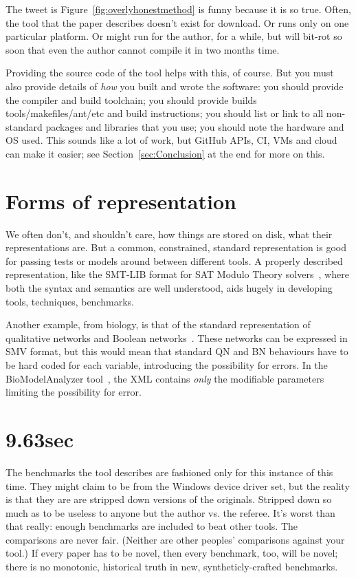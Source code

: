 \documentclass[conference]{IEEEtran}
\begin{document}
The tweet is Figure~\ref{fig:overlyhonestmethod} is funny because it
is so true. Often, the tool that the paper describes doesn't exist for
download. Or runs only on one particular platform. Or might run for
the author, for a while, but will bit-rot so soon that even the author
cannot compile it in two months time.

Providing the source code of the tool helps with this, of course. But
you must also provide details of \emph{how} you built and wrote the
software:
%
you should provide the compiler and build toolchain; 
%
you should provide builds tools/makefiles/ant/etc and build instructions; 
%
you should list or link to all non-standard packages and libraries that you use; 
%
you should note the hardware and OS used. 
%
This sounds like a lot of work, but GitHub APIs, CI, VMs and cloud can
make it easier; see Section~\ref{sec:Conclusion} at the end for more
on this.


\section{Forms of representation}


We often don't, and shouldn't care, how things are stored on disk,
what their representations are. But a common, constrained, standard
representation is good for passing tests or models around between
different tools. A properly described representation, like the SMT-LIB
format for SAT Modulo Theory solvers~\cite{smtlib}, where both the
syntax and semantics are well understood, aids hugely in developing
tools, techniques, benchmarks.

Another example, from biology, is that of the standard representation
of qualitative networks and Boolean
networks~\cite{Kauffman1969,Schaub2007}.  These networks can be
expressed in SMV format, but this would mean that standard QN and BN
behaviours have to be hard coded for each variable, introducing the
possibility for errors. In the BioModelAnalyzer
tool~\cite{Benque2012}, the XML contains \emph{only} the modifiable
parameters limiting the possibility for error.


\section{9.63sec} 

The benchmarks the tool describes are fashioned only for this instance
of this time. They might claim to be from the Windows device driver
set, but the reality is that they are are stripped down versions of
the originals. Stripped down so much as to be useless to anyone but
the author vs. the referee. It's worst than that really: enough
benchmarks are included to beat other tools. The comparisons are never
fair. (Neither are other peoples' comparisons against your tool.) If
every paper has to be novel, then every benchmark, too, will be novel;
there is no monotonic, historical truth in new, syntheticly-crafted
benchmarks.
\end{document}
